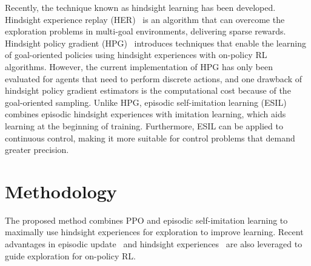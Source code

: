 Recently, the technique known as hindsight learning has been developed. Hindsight experience replay (HER)~\cite{andrychowicz2017hindsight} is an algorithm that can overcome the exploration problems in multi-goal environments, delivering sparse rewards. Hindsight policy gradient (HPG)~\cite{rauber2018hindsight} introduces techniques that enable the learning of goal-oriented policies using hindsight experiences with on-policy RL algorithms. However, the current implementation of HPG has only been evaluated for agents that need to perform discrete actions, and one drawback of hindsight policy gradient estimators is the computational cost because of the goal-oriented sampling. Unlike HPG, episodic self-imitation learning (ESIL) combines episodic hindsight experiences with imitation learning, which aids learning at the beginning of training. Furthermore, ESIL can be applied to continuous control, making it more suitable for control problems that demand greater precision.

\section{Methodology}
\label{sec:method}
The proposed method combines PPO and episodic self-imitation learning to maximally use hindsight experiences for exploration to improve learning. {Recent advantages in episodic update~\cite{lee2019sample} and hindsight experiences~\cite{andrychowicz2017hindsight} are also leveraged} to guide exploration for on-policy RL. 

